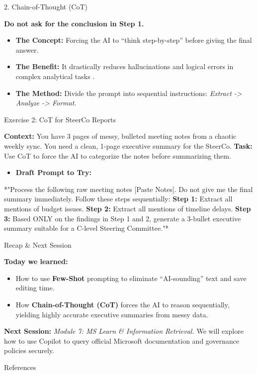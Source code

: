 \documentclass[aspectratio=169]{beamer}
\begin{document}
\begin{frame}[fragile]{2. Chain-of-Thought (CoT)}


\textbf{Do not ask for the conclusion in Step 1.}

\begin{itemize}
  \item \textbf{The Concept:} Forcing the AI to ``think step-by-step'' before giving the final answer.
  \item \textbf{The Benefit:} It drastically reduces hallucinations and logical errors in complex analytical tasks \cite{cot2026}.
  \item \textbf{The Method:} Divide the prompt into sequential instructions: \textit{Extract -> Analyze -> Format}.
\end{itemize}
\end{frame}



\begin{frame}[fragile]{Exercise 2: CoT for SteerCo Reports}


\textbf{Context:} You have 3 pages of messy, bulleted meeting notes from a chaotic weekly sync. You need a clean, 1-page executive summary for the SteerCo.
\textbf{Task:} Use CoT to force the AI to categorize the notes before summarizing them.

\begin{itemize}
  \item \textbf{Draft Prompt to Try:}
\end{itemize}
*"Process the following raw meeting notes [Paste Notes]. Do not give me the final summary immediately. Follow these steps sequentially:
\textbf{Step 1:} Extract all mentions of budget issues.
\textbf{Step 2:} Extract all mentions of timeline delays.
\textbf{Step 3:} Based ONLY on the findings in Step 1 and 2, generate a 3-bullet executive summary suitable for a C-level Steering Committee."*

\end{frame}



\begin{frame}[fragile]{Recap \& Next Session}


\textbf{Today we learned:}
\begin{itemize}
  \item How to use \textbf{Few-Shot} prompting to eliminate ``AI-sounding'' text and save editing time.
  \item How \textbf{Chain-of-Thought (CoT)} forces the AI to reason sequentially, yielding highly accurate executive summaries from messy data.
\end{itemize}
\textbf{Next Session:}
\textit{Module 7: MS Learn \& Information Retrieval.} We will explore how to use Copilot to query official Microsoft documentation and governance policies securely.
\end{frame}




\begin{frame}[allowframebreaks]{References}
  
  
\end{frame}
\end{document}
